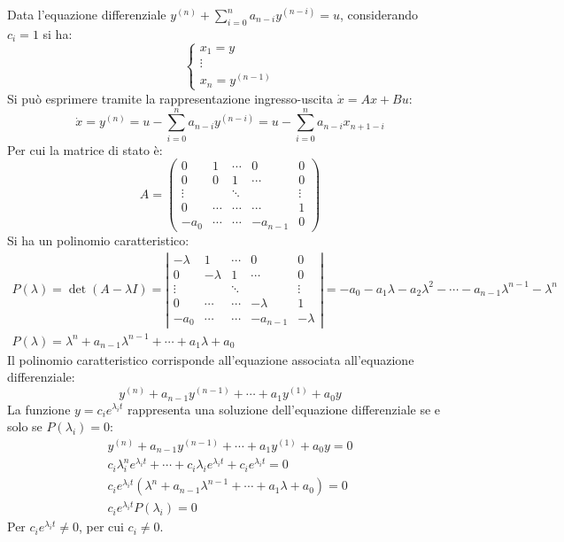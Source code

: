 \documentclass{article}
\numberwithin{equation}{subsection}
\begin{document}
Data l'equazione differenziale $y^{(n)}+\displaystyle\sum_{i=0}^{n}a_{n-i}y^{(n-i)}=u$, considerando $c_i=1$ si ha:
\begin{equation*}
    \begin{cases}
        x_1=y\\
        \vdots\\
        x_n=y^{(n-1)}
    \end{cases}
\end{equation*}
Si può esprimere tramite la rappresentazione ingresso-uscita $\dot x=Ax+Bu$: 
\begin{equation*}
    \dot x=y^{(n)}=u-\displaystyle\sum_{i=0}^{n}a_{n-i}y^{(n-i)}=u-\sum_{i=0}^{n}a_{n-i}x_{n+1-i}
\end{equation*}
Per cui la matrice di stato è:
\begin{equation*}
    A=
    \begin{pmatrix}
        0 & 1 & \cdots & 0 & 0\\
        0 & 0 & 1 & \cdots & 0\\
        \vdots & & \ddots & & \vdots\\
        0 & \cdots & \cdots & \cdots & 1\\
        -a_0 & \cdots & \cdots & -a_{n-1} & 0
    \end{pmatrix}
\end{equation*}
Si ha un polinomio caratteristico: 
\begin{gather*}
    P(\lambda)=\det(A-\lambda I)=
    \left|\begin{matrix}
        -\lambda & 1 & \cdots & 0 & 0\\
        0 & -\lambda & 1 & \cdots & 0\\
        \vdots & & \ddots & & \vdots\\
        0 & \cdots & \cdots & -\lambda & 1\\
        -a_0 & \cdots & \cdots & -a_{n-1} & -\lambda
    \end{matrix}\right|=
    -a_0-a_1\lambda-a_2\lambda^2-\cdots-a_{n-1}\lambda^{n-1}-\lambda^n\\
    P(\lambda)=\lambda^n+a_{n-1}\lambda^{n-1}+\cdots+a_1\lambda+a_0
\end{gather*}
Il polinomio caratteristico corrisponde all'equazione associata all'equazione differenziale:
\begin{equation*}
    y^{(n)}+a_{n-1}y^{(n-1)}+\cdots+a_1y^{(1)}+a_0y
\end{equation*}
La funzione $y=c_ie^{\lambda_it}$ rappresenta una soluzione dell'equazione differenziale se e solo se $P(\lambda_i)=0$:
\begin{gather*}
    y^{(n)}+a_{n-1}y^{(n-1)}+\cdots+a_1y^{(1)}+a_0y=0\\
    c_i\lambda_i^ne^{\lambda_it}+\cdots+c_i\lambda_ie^{\lambda_it}+c_ie^{\lambda_it}=0\\
    c_ie^{\lambda_it}(\lambda^n+a_{n-1}\lambda^{n-1}+\cdots+a_1\lambda+a_0)=0\\
    c_ie^{\lambda_it}P(\lambda_i)=0
\end{gather*}
Per $c_ie^{\lambda_it}\neq0$, per cui $c_i\neq0$. 
\end{document}
